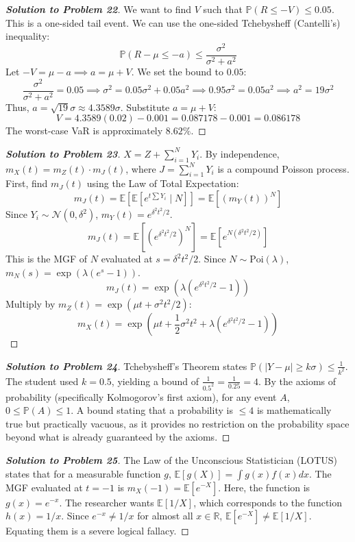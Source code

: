 \documentclass[11pt, a4paper]{article}
\theoremstyle{definition}
\theoremstyle{remark}
\newcommand{\R}{\mathbb{R}}
\newcommand{\E}{\mathbb{E}}
\newcommand{\Prob}{\mathbb{P}}
\begin{document}
\begin{proof}[\textbf{Solution to Problem 22}]
We want to find $V$ such that $\Prob(R \le -V) \le 0.05$.
This is a one-sided tail event. We can use the one-sided Tchebysheff (Cantelli's) inequality:
\[ \Prob(R - \mu \le -a) \le \frac{\sigma^2}{\sigma^2 + a^2} \]
Let $-V = \mu - a \implies a = \mu + V$. We set the bound to $0.05$:
\[ \frac{\sigma^2}{\sigma^2 + a^2} = 0.05 \implies \sigma^2 = 0.05\sigma^2 + 0.05a^2 \implies 0.95\sigma^2 = 0.05a^2 \implies a^2 = 19\sigma^2 \]
Thus, $a = \sqrt{19}\sigma \approx 4.3589\sigma$.
Substitute $a = \mu + V$:
\[ V = 4.3589(0.02) - 0.001 = 0.087178 - 0.001 = 0.086178 \]
The worst-case VaR is approximately $8.62\%$.
\end{proof}

\begin{proof}[\textbf{Solution to Problem 23}]
$X = Z + \sum_{i=1}^N Y_i$. By independence, $m_X(t) = m_Z(t) \cdot m_J(t)$, where $J = \sum_{i=1}^N Y_i$ is a compound Poisson process.
First, find $m_J(t)$ using the Law of Total Expectation:
\[ m_J(t) = \E[\E[e^{t \sum Y_i} \mid N]] = \E[(m_Y(t))^N] \]
Since $Y_i \sim \mathcal{N}(0, \delta^2)$, $m_Y(t) = e^{\delta^2 t^2 / 2}$.
\[ m_J(t) = \E[(e^{\delta^2 t^2 / 2})^N] = \E[e^{N(\delta^2 t^2 / 2)}] \]
This is the MGF of $N$ evaluated at $s = \delta^2 t^2 / 2$. Since $N \sim \text{Poi}(\lambda)$, $m_N(s) = \exp(\lambda(e^s - 1))$.
\[ m_J(t) = \exp\left( \lambda(e^{\delta^2 t^2 / 2} - 1) \right) \]
Multiply by $m_Z(t) = \exp(\mu t + \sigma^2 t^2 / 2)$:
\[ m_X(t) = \exp\left( \mu t + \frac{1}{2}\sigma^2 t^2 + \lambda(e^{\delta^2 t^2 / 2} - 1) \right) \]
\end{proof}

\begin{proof}[\textbf{Solution to Problem 24}]
Tchebysheff's Theorem states $\Prob(|Y - \mu| \ge k\sigma) \le \frac{1}{k^2}$.
The student used $k = 0.5$, yielding a bound of $\frac{1}{0.5^2} = \frac{1}{0.25} = 4$.
By the axioms of probability (specifically Kolmogorov's first axiom), for any event $A$, $0 \le \Prob(A) \le 1$.
A bound stating that a probability is $\le 4$ is mathematically true but practically vacuous, as it provides no restriction on the probability space beyond what is already guaranteed by the axioms.
\end{proof}

\begin{proof}[\textbf{Solution to Problem 25}]
The Law of the Unconscious Statistician (LOTUS) states that for a measurable function $g$, $\E[g(X)] = \int g(x)f(x)dx$.
The MGF evaluated at $t=-1$ is $m_X(-1) = \E[e^{-X}]$. Here, the function is $g(x) = e^{-x}$.
The researcher wants $\E[1/X]$, which corresponds to the function $h(x) = 1/x$.
Since $e^{-x} \neq 1/x$ for almost all $x \in \R$, $\E[e^{-X}] \neq \E[1/X]$. Equating them is a severe logical fallacy.
\end{proof}
\end{document}

